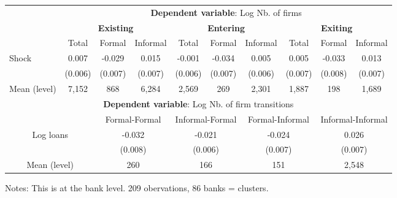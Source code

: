 \centering
\begin{threeparttable}
\begin{tabular}{lccccccccc}
\toprule
& \multicolumn{9}{c}{\textbf{Dependent variable}: Log Nb. of firms} \\
\cmidrule(lr){2-10}
 & \multicolumn{3}{c}{\textbf{Existing}} & \multicolumn{3}{c}{\textbf{Entering}} & \multicolumn{3}{c}{\textbf{Exiting}} \\
\cmidrule(lr){2-10}
& Total 
& Formal 
& \multicolumn{1}{c}{Informal}
& Total 
& Formal 
& \multicolumn{1}{c}{Informal}
& Total 
& Formal 
& Informal \\
\midrule
Shock 
&  0.007 & -0.029  & 0.015   &  -0.001  & -0.034   & 0.005  & 0.005   & -0.033   & 0.013 \\
& (0.006) & (0.007) & (0.007) & (0.006) & (0.007) & (0.006) & (0.007) & (0.008) & (0.007) \\
\midrule
Mean (level) & 7,152 & 868 & 6,284 & 2,569 & 269 & 2,301 & 1,887 & 198 & 1,689\\

\multicolumn{10}{c}{\textbf{Dependent variable}: Log Nb. of firm transitions} \\
\cmidrule(lr){3-10}

\multicolumn{2}{c}{} & \multicolumn{2}{c}{Formal-Formal} & \multicolumn{2}{c}{Informal-Formal} & \multicolumn{2}{c}{Formal-Informal} & \multicolumn{2}{c}{Informal-Informal} \\
\midrule 
\multicolumn{2}{c}{Log loans} & \multicolumn{2}{c}{-0.032} & \multicolumn{2}{c}{-0.021} & \multicolumn{2}{c}{-0.024} & \multicolumn{2}{c}{0.026} \\
\multicolumn{2}{c}{} & \multicolumn{2}{c}{(0.008)} & \multicolumn{2}{c}{(0.006)} & \multicolumn{2}{c}{(0.007)} & \multicolumn{2}{c}{(0.007)} \\
\midrule
\multicolumn{2}{c}{Mean (level)} & \multicolumn{2}{c}{260} & \multicolumn{2}{c}{166} & \multicolumn{2}{c}{151} & \multicolumn{2}{c}{2,548} \\

\bottomrule
\end{tabular}
\begin{tablenotes}[flushleft]
\tiny
\item Notes: This is at the bank level. 209 obervations, 86 banks = clusters.
\end{tablenotes}
\end{threeparttable}
